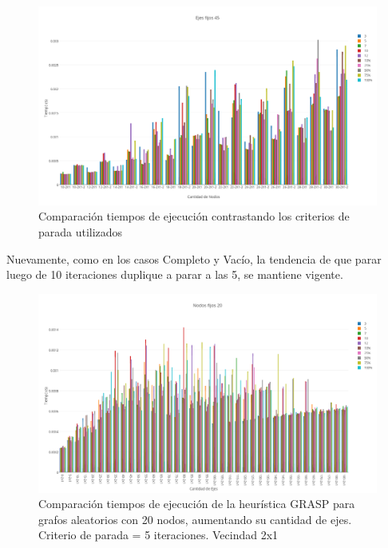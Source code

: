   \begin{figure}[h!]
   \begin{center}
 	\includegraphics[scale=0.35]{imagenes/grasp/45ejes-5vs10.png}
 	\caption{Comparaci\'on tiempos de ejecuci\'on contrastando los criterios de parada utilizados}
   \end{center}
 \end{figure}
\newpage

Nuevamente, como en los casos Completo y Vac\'io, la tendencia de que parar luego de 10 iteraciones duplique a parar a las 5, se mantiene vigente.

  \begin{figure}[h!]
   \begin{center}
 	\includegraphics[scale=0.35]{imagenes/grasp/20nodos-5repes-v1.png}
 	\caption{Comparaci\'on tiempos de ejecuci\'on de la heur\'istica GRASP para grafos aleatorios con 20 nodos, aumentando su cantidad de ejes. Criterio de parada = 5 iteraciones. Vecindad 2x1}
   \end{center}
 \end{figure}
\newpage

